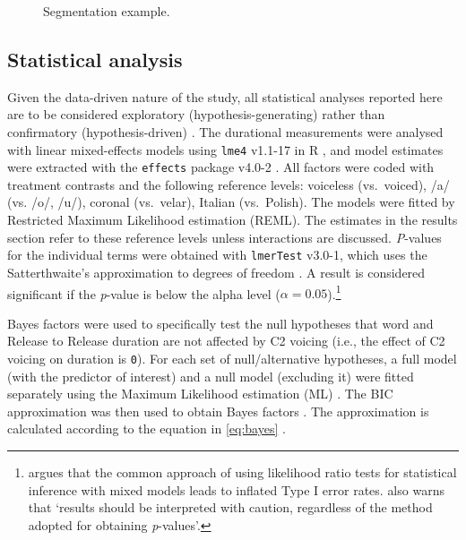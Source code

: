 \documentclass[preprint]{JASAnew}
\begin{document}
\begin{figure}
  \caption{Segmentation example.}
  \label{f:segmentation}
\end{figure}

\hypertarget{statistical-analysis}{%
\subsection{Statistical analysis}\label{statistical-analysis}}

Given the data-driven nature of the study, all statistical analyses
reported here are to be considered exploratory (hypothesis-generating)
rather than confirmatory (hypothesis-driven)
\citep{kerr1998, gelman2013, roettger2018}. The durational measurements
were analysed with linear mixed-effects models using \texttt{lme4}
v1.1-17 in R \citep{bates2015}, and model estimates were extracted with
the \texttt{effects} package v4.0-2 \citep{fox2003}. All factors were
coded with treatment contrasts and the following reference levels:
voiceless (vs.~voiced), /a/ (vs. /o/, /u/), coronal (vs.~velar), Italian
(vs.~Polish). The models were fitted by Restricted Maximum Likelihood
estimation (REML). The estimates in the results section refer to these
reference levels unless interactions are discussed. \emph{P}-values for
the individual terms were obtained with \texttt{lmerTest} v3.0-1, which
uses the Satterthwaite's approximation to degrees of freedom
\citep{kuznetsova2017, luke2017}. A result is considered significant if
the \emph{p}-value is below the alpha level
(\(\alpha = 0.05\)).\footnote{\citet{luke2017} argues that the common approach of using likelihood ratio tests for statistical inference with mixed models leads to inflated Type I error rates. \citet[1501]{luke2017} also warns that `results should be interpreted with caution, regardless of the method adopted for obtaining \textit{p}-values'.}

Bayes factors were used to specifically test the null hypotheses that
word and Release to Release duration are not affected by C2 voicing
(i.e., the effect of C2 voicing on duration is \texttt{0}). For each set
of null/alternative hypotheses, a full model (with the predictor of
interest) and a null model (excluding it) were fitted separately using
the Maximum Likelihood estimation (ML) \citep[p.~34]{bates2015}. The BIC
approximation was then used to obtain Bayes factors
\citep{raftery1995, raftery1999, wagenmakers2007, jarosz2014}. The
approximation is calculated according to the equation in \ref{eq:bayes}
\citep[p.~796]{wagenmakers2007}.
\end{document}
